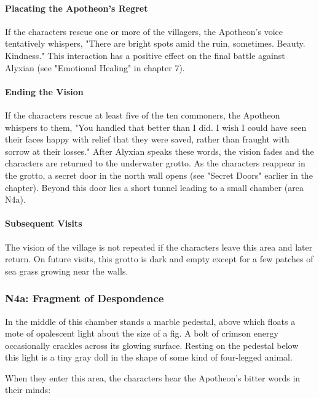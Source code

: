 \documentclass[10pt,a4paper,twoside,twocolumn,openany,nodeprecatedcode]{dndbook}
\begin{document}
\paragraph{Placating the Apotheon's Regret}
If the characters rescue one or more of the villagers, the Apotheon's voice tentatively whispers, "There are bright spots amid the ruin, sometimes. Beauty. Kindness." This interaction has a positive effect on the final battle against Alyxian (see "Emotional Healing" in chapter 7).

\paragraph{Ending the Vision}
If the characters rescue at least five of the ten commoners, the Apotheon whispers to them, "You handled that better than I did. I wish I could have seen their faces happy with relief that they were saved, rather than fraught with sorrow at their losses." After Alyxian speaks these words, the vision fades and the characters are returned to the underwater grotto. As the characters reappear in the grotto, a secret door in the north wall opens (see "Secret Doors" earlier in the chapter). Beyond this door lies a short tunnel leading to a small chamber (area N4a).

\paragraph{Subsequent Visits}
The vision of the village is not repeated if the characters leave this area and later return. On future visits, this grotto is dark and empty except for a few patches of sea grass growing near the walls.

\subsubsection{N4a: Fragment of Despondence}
\begin{DndReadAloud}{}
In the middle of this chamber stands a marble pedestal, above which floats a mote of opalescent light about the size of a fig. A bolt of crimson energy occasionally crackles across its glowing surface. Resting on the pedestal below this light is a tiny gray doll in the shape of some kind of four-legged animal.

\end{DndReadAloud}

When they enter this area, the characters hear the Apotheon's bitter words in their minds:
\end{document}
